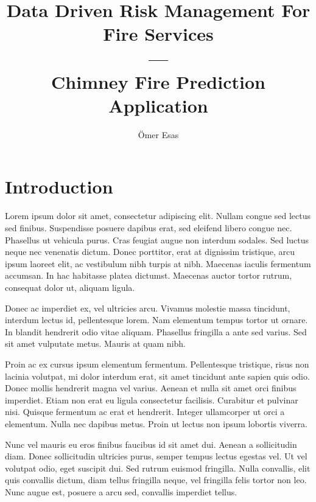 \documentclass{utitcphd_overleaf}
\title{\texorpdfstring{Data Driven Risk Management For Fire Services\\ ---\\Chimney Fire Prediction Application}{Data Driven Risk Management For Fire Services - Chimney Fire Prediction Application}}
\author{Ömer Esas}                                         %
\begin{document}

\openright
\frontmatter

% 
% 
% 

\tableofcontents

\mainmatter

\chapter{Introduction}
\label{chap:introduction}

Lorem ipsum dolor sit amet, consectetur adipiscing elit. Nullam congue sed lectus sed finibus. Suspendisse posuere dapibus erat, sed eleifend libero congue nec. Phasellus ut vehicula purus. Cras feugiat augue non interdum sodales. Sed luctus neque nec venenatis dictum. Donec porttitor, erat at dignissim tristique, arcu ipsum laoreet elit, ac vestibulum nibh turpis at nibh. Maecenas iaculis fermentum accumsan. In hac habitasse platea dictumst. Maecenas auctor tortor rutrum, consequat dolor ut, aliquam ligula.

Donec ac imperdiet ex, vel ultricies arcu. Vivamus molestie massa tincidunt, interdum lectus id, pellentesque lorem. Nam elementum tempus tortor ut ornare. In blandit hendrerit odio vitae aliquam. Phasellus fringilla a ante sed varius. Sed sit amet vulputate metus. Mauris at quam nibh.

Proin ac ex cursus ipsum elementum fermentum. Pellentesque tristique, risus non lacinia volutpat, mi dolor interdum erat, sit amet tincidunt ante sapien quis odio. Donec mollis hendrerit magna vel varius. Aenean et nulla sit amet orci finibus imperdiet. Etiam non erat eu ligula consectetur facilisis. Curabitur et pulvinar nisi. Quisque fermentum ac erat et hendrerit. Integer ullamcorper ut orci a elementum. Nulla nec dapibus metus. Proin ut lectus non ipsum lobortis viverra.

Nunc vel mauris eu eros finibus faucibus id sit amet dui. Aenean a sollicitudin diam. Donec sollicitudin ultricies purus, semper tempus lectus egestas vel. Ut vel volutpat odio, eget suscipit dui. Sed rutrum euismod fringilla. Nulla convallis, elit quis convallis dictum, diam tellus fringilla neque, vel fringilla felis tortor non leo. Nunc augue est, posuere a arcu sed, convallis imperdiet tellus.
\end{document}
